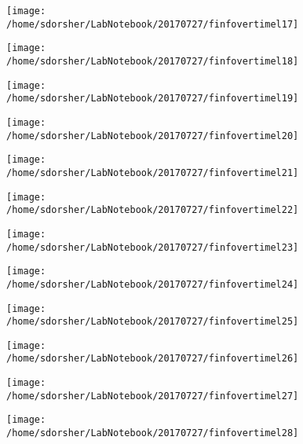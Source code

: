 \documentclass{article}
\begin{document}
\begin{figure}
  \texttt{[image: /home/sdorsher/LabNotebook/20170727/finfovertimel17]}
\end{figure}

\begin{figure}
  \texttt{[image: /home/sdorsher/LabNotebook/20170727/finfovertimel18]}
\end{figure}

\begin{figure}
  \texttt{[image: /home/sdorsher/LabNotebook/20170727/finfovertimel19]}
\end{figure}

\begin{figure}
  \texttt{[image: /home/sdorsher/LabNotebook/20170727/finfovertimel20]}
\end{figure}

\begin{figure}
  \texttt{[image: /home/sdorsher/LabNotebook/20170727/finfovertimel21]}
\end{figure}

\begin{figure}
  \texttt{[image: /home/sdorsher/LabNotebook/20170727/finfovertimel22]}
\end{figure}

\begin{figure}
  \texttt{[image: /home/sdorsher/LabNotebook/20170727/finfovertimel23]}
\end{figure}

\begin{figure}
  \texttt{[image: /home/sdorsher/LabNotebook/20170727/finfovertimel24]}
\end{figure}

\begin{figure}
  \texttt{[image: /home/sdorsher/LabNotebook/20170727/finfovertimel25]}
\end{figure}

\begin{figure}
  \texttt{[image: /home/sdorsher/LabNotebook/20170727/finfovertimel26]}
\end{figure}

\begin{figure}
  \texttt{[image: /home/sdorsher/LabNotebook/20170727/finfovertimel27]}
\end{figure}

\begin{figure}
  \texttt{[image: /home/sdorsher/LabNotebook/20170727/finfovertimel28]}
\end{figure}
\end{document}
